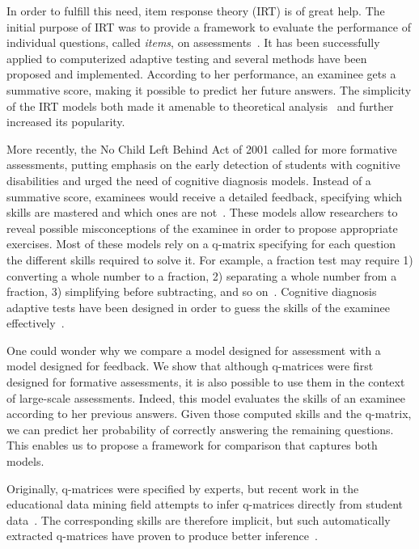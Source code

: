 \documentclass{sig-alternate}
\begin{document}
In order to fulfill this need, item response theory (IRT) is of great help. The initial purpose of IRT was to provide a framework to evaluate the performance of individual questions, called \emph{items}, on assessments~\citep{Hambleton1991}. It has been successfully applied to computerized adaptive testing and several methods have been proposed and implemented. According to her performance, an examinee gets a summative score, making it possible to predict her future answers. The simplicity of the IRT models both made it amenable to theoretical analysis~\citep{Baker2004} and further increased its popularity.

More recently, the No Child Left Behind Act of 2001 called for more formative assessments, putting emphasis on the early detection of students with cognitive disabilities and urged the need of cognitive diagnosis models. Instead of a summative score, examinees would receive a detailed feedback, specifying which skills are mastered and which ones are not~\citep{Cheng2009}. These models allow researchers to reveal possible misconceptions of the examinee in order to propose appropriate exercises. Most of these models rely on a q-matrix specifying for each question the different skills required to solve it. For example, a fraction test may require 1) converting a whole number to a fraction, 2) separating a whole number from a fraction, 3) simplifying before subtracting, and so on~\citep{DeLaTorreDouglas2004}. Cognitive diagnosis adaptive tests have been designed in order to guess the skills of the examinee effectively~\citep{Huebner2010}.

One could wonder why we compare a model designed for assessment with a model designed for feedback. We show that although q-matrices were first designed for formative assessments, it is also possible to use them in the context of large-scale assessments. Indeed, this model evaluates the skills of an examinee according to her previous answers. Given those computed skills and the q-matrix, we can predict her probability of correctly answering the remaining questions. This enables us to propose a framework for comparison that captures both models.

Originally, q-matrices were specified by experts, but recent work in the educational data mining field attempts to infer q-matrices directly from student data~\citep{Huebner2010}. The corresponding skills are therefore implicit, but such automatically extracted q-matrices have proven to produce better inference~\citep{Barnes2003}.
\end{document}
